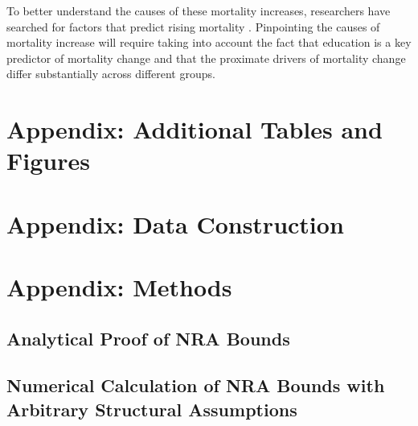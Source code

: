 \documentclass[12pt,letterpaper]{article}
\numberwithin{equation}{section}
\begin{document}
To better understand the causes of these mortality increases, researchers have searched for factors that predict rising mortality \citep{Cutler2011,Case2017,Ruhm2018}. Pinpointing the causes of mortality increase will require taking into account the fact that education is a key predictor of mortality change and that the proximate drivers of mortality change differ substantially across different groups.

\begin{appendix}

\newpage
\singlespace





\floatbarrier
\clearpage

\floatbarrier

\newpage 
\renewcommand{\thetable}{A\arabic{table}}
\setcounter{table}{0}
\renewcommand{\thefigure}{A\arabic{figure}}
\setcounter{figure}{0}
\section{Appendix: Additional Tables and Figures} 
\label{sec:app_figs}


\newpage 
\clearpage 
\section{Appendix: Data Construction}
\label{sec:app_data}
\normalsize  

\newpage 
\clearpage
\section{Appendix: Methods}
\renewcommand{\thefigure}{C\arabic{figure}}
\setcounter{figure}{0}
\renewcommand{\thetable}{C\arabic{table}}
\setcounter{table}{0}

\subsection{Analytical Proof of NRA Bounds}
\label{sec:app_proofs}
\normalsize  

\subsection{Numerical Calculation of NRA Bounds with Arbitrary Structural Assumptions} 
\label{sec:app_numerical} 
\normalsize 


\end{appendix}
\end{document}
